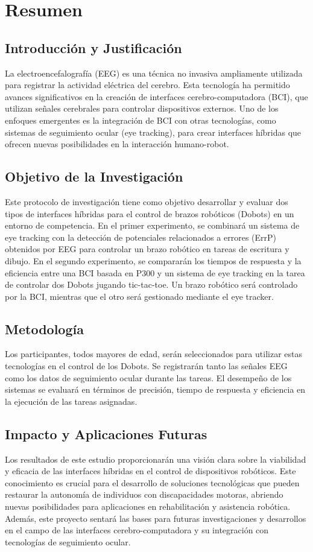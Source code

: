 \documentclass[12pt]{article}
\begin{document}
\section{Resumen}

\subsection{Introducción y Justificación}
La electroencefalografía (EEG) es una técnica no invasiva ampliamente utilizada para registrar la actividad eléctrica del cerebro. Esta tecnología ha permitido avances significativos en la creación de interfaces cerebro-computadora (BCI), que utilizan señales cerebrales para controlar dispositivos externos. Uno de los enfoques emergentes es la integración de BCI con otras tecnologías, como sistemas de seguimiento ocular (eye tracking), para crear interfaces híbridas que ofrecen nuevas posibilidades en la interacción humano-robot.

\subsection{Objetivo de la Investigación}
Este protocolo de investigación tiene como objetivo desarrollar y evaluar dos tipos de interfaces híbridas para el control de brazos robóticos (Dobots) en un entorno de competencia. En el primer experimento, se combinará un sistema de eye tracking con la detección de potenciales relacionados a errores (ErrP) obtenidos por EEG para controlar un brazo robótico en tareas de escritura y dibujo. En el segundo experimento, se compararán los tiempos de respuesta y la eficiencia entre una BCI basada en P300 y un sistema de eye tracking en la tarea de controlar dos Dobots jugando tic-tac-toe. Un brazo robótico será controlado por la BCI, mientras que el otro será gestionado mediante el eye tracker.

\subsection{Metodología}
Los participantes, todos mayores de edad, serán seleccionados para utilizar estas tecnologías en el control de los Dobots. Se registrarán tanto las señales EEG como los datos de seguimiento ocular durante las tareas. El desempeño de los sistemas se evaluará en términos de precisión, tiempo de respuesta y eficiencia en la ejecución de las tareas asignadas.

\subsection{Impacto y Aplicaciones Futuras}
Los resultados de este estudio proporcionarán una visión clara sobre la viabilidad y eficacia de las interfaces híbridas en el control de dispositivos robóticos. Este conocimiento es crucial para el desarrollo de soluciones tecnológicas que pueden restaurar la autonomía de individuos con discapacidades motoras, abriendo nuevas posibilidades para aplicaciones en rehabilitación y asistencia robótica. Además, este proyecto sentará las bases para futuras investigaciones y desarrollos en el campo de las interfaces cerebro-computadora y su integración con tecnologías de seguimiento ocular.
\end{document}

